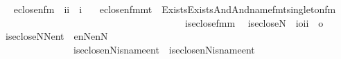 \begin{isabellebody}
\isanewline
{}\isamarkupfalse%
\ \isanewline
\ \ eclose{\isacharunderscore}{\kern0pt}n{}{\isacharunderscore}{\kern0pt}fm\ {\isacharcolon}{\kern0pt}{\isacharcolon}{\kern0pt}\ {\isachardoublequoteopen}{\isacharbrackleft}{\kern0pt}i{\isacharcomma}{\kern0pt}i{\isacharbrackright}{\kern0pt}\ {\isasymRightarrow}\ i{\isachardoublequoteclose}\ \isanewline
\ \ {\isachardoublequoteopen}eclose{\isacharunderscore}{\kern0pt}n{}{\isacharunderscore}{\kern0pt}fm{\isacharparenleft}{\kern0pt}m{\isacharcomma}{\kern0pt}t{\isacharparenright}{\kern0pt}\ {\isasymequiv}\ Exists{\isacharparenleft}{\kern0pt}Exists{\isacharparenleft}{\kern0pt}And{\isacharparenleft}{\kern0pt}And{\isacharparenleft}{\kern0pt}name{}{\isacharunderscore}{\kern0pt}fm{\isacharparenleft}{\kern0pt}t{\isacharhash}{\kern0pt}{\isacharplus}{\kern0pt}{}{\isacharcomma}{\kern0pt}{}{\isacharparenright}{\kern0pt}{\isacharcomma}{\kern0pt}singleton{\isacharunderscore}{\kern0pt}fm{\isacharparenleft}{\kern0pt}{}{\isacharcomma}{\kern0pt}{}{\isacharparenright}{\kern0pt}{\isacharparenright}{\kern0pt}{\isacharcomma}{\kern0pt}\isanewline
\ \ \ \ \ \ \ \ \ \ \ \ \ \ \ \ \ \ \ \ \ \ \ \ \ \ \ \ \ \ \ \ \ \ \ \ \ \ \ is{\isacharunderscore}{\kern0pt}eclose{\isacharunderscore}{\kern0pt}fm{\isacharparenleft}{\kern0pt}{}{\isacharcomma}{\kern0pt}m{\isacharhash}{\kern0pt}{\isacharplus}{\kern0pt}{}{\isacharparenright}{\kern0pt}{\isacharparenright}{\kern0pt}{\isacharparenright}{\kern0pt}{\isacharparenright}{\kern0pt}{\isachardoublequoteclose}\isanewline
\isanewline
{}\isamarkupfalse%
\isanewline
\ \ is{\isacharunderscore}{\kern0pt}ecloseN\ {\isacharcolon}{\kern0pt}{\isacharcolon}{\kern0pt}\ {\isachardoublequoteopen}{\isacharbrackleft}{\kern0pt}i{\isasymRightarrow}o{\isacharcomma}{\kern0pt}i{\isacharcomma}{\kern0pt}i{\isacharbrackright}{\kern0pt}\ {\isasymRightarrow}\ o{\isachardoublequoteclose}\ \isanewline
\ \ {\isachardoublequoteopen}is{\isacharunderscore}{\kern0pt}ecloseN{\isacharparenleft}{\kern0pt}N{\isacharcomma}{\kern0pt}en{\isacharcomma}{\kern0pt}t{\isacharparenright}{\kern0pt}\ {\isasymequiv}\ {\isasymexists}en{}{\isacharbrackleft}{\kern0pt}N{\isacharbrackright}{\kern0pt}{\isachardot}{\kern0pt}{\isasymexists}en{}{\isacharbrackleft}{\kern0pt}N{\isacharbrackright}{\kern0pt}{\isachardot}{\kern0pt}\isanewline
\ \ \ \ \ \ \ \ \ \ \ \ \ \ \ \ is{\isacharunderscore}{\kern0pt}eclose{\isacharunderscore}{\kern0pt}n{\isacharparenleft}{\kern0pt}N{\isacharcomma}{\kern0pt}is{\isacharunderscore}{\kern0pt}name{}{\isacharcomma}{\kern0pt}en{}{\isacharcomma}{\kern0pt}t{\isacharparenright}{\kern0pt}\ {\isasymand}\ is{\isacharunderscore}{\kern0pt}eclose{\isacharunderscore}{\kern0pt}n{\isacharparenleft}{\kern0pt}N{\isacharcomma}{\kern0pt}is{\isacharunderscore}{\kern0pt}name{}{\isacharcomma}{\kern0pt}en{}{\isacharcomma}{\kern0pt}t{\isacharparenright}{\kern0pt}{\isasymand}\isanewline

\end{isabellebody}
